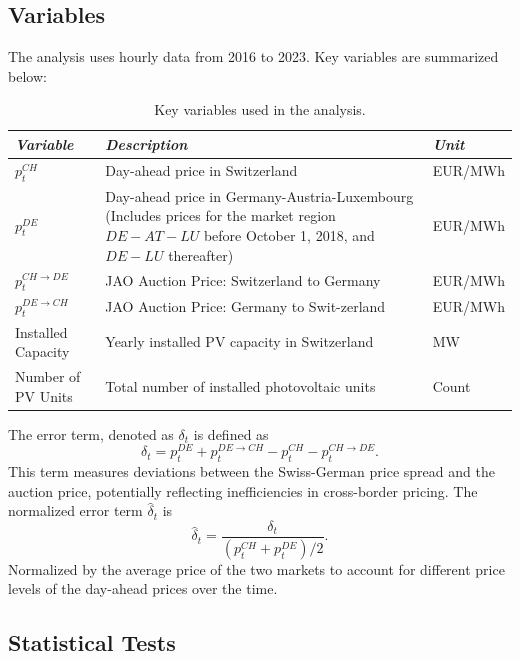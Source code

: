 \documentclass[12pt]{article}
\begin{document}
\subsection{Variables}

The analysis uses hourly data from 2016 to 2023. Key variables are summarized below:
\begin{table}[ht]
    \footnotesize
    \centering
    \begin{tabular}{|l|p{6cm}|l|}
        \hline
        \textit{Variable} & \textit{Description} & \textit{Unit} \\ \hline
        \( p_t^{CH} \) & Day-ahead price in Switzerland & EUR/MWh \\ \hline
        \( p_t^{DE} \) & Day-ahead price in Germany-Austria-Luxembourg (Includes prices for the market region \( DE-AT-LU \) before October 1, 2018, and \( DE-LU \) thereafter) & EUR/MWh \\ \hline
        \( p_t^{CH \rightarrow DE} \) & JAO Auction Price: Switzerland to Germany & EUR/MWh \\ \hline
        \( p_t^{DE\rightarrow CH} \) & JAO Auction Price: Germany to Swit-zerland & EUR/MWh \\ \hline
        Installed Capacity & Yearly installed PV capacity in Switzerland & MW \\ \hline
        Number of PV Units & Total number of installed photovoltaic units & Count \\ \hline
    \end{tabular}
    \caption{Key variables used in the analysis.}
\end{table}

The error term, denoted as $\delta_t$ is defined as
\begin{equation}
    \delta_t = p_t^{DE} + p_t^{DE \rightarrow CH} - p_t^{CH} - p_t^{CH \rightarrow DE}.
\end{equation}
This term measures deviations between the Swiss-German price spread and the auction price, potentially reflecting inefficiencies in cross-border pricing. \newline
The normalized error term $\hat{\delta}_t$ is 
\begin{equation}
    \hat{\delta}_t = \frac{\delta_t}{(p_t^{CH} + p_t^{DE})/2}.
\end{equation}
Normalized by the average price of the two markets to account for different price levels of the day-ahead prices over the time. 

\subsection{Statistical Tests}
\end{document}
